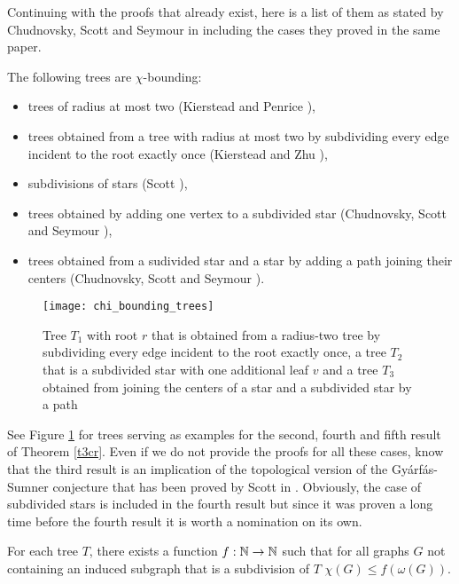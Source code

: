 Continuing with the proofs that already exist, here is a list of them as stated by Chudnovsky, Scott and Seymour in \cite{CSS17} including the cases they proved in the same paper.

\begin{thm}\label{t3cr}
The following trees are $\chi$-bounding:
\begin{itemize}
\item trees of radius at most two (Kierstead and Penrice \cite{Ki94}),
\item trees obtained from a tree with radius at most two by subdividing every edge incident to the root exactly once (Kierstead and Zhu \cite{Ki04}),
\item subdivisions of stars (Scott \cite{Sc97}),
\item trees obtained by adding one vertex to a subdivided star (Chudnovsky, Scott and Seymour \cite{CSS17}),
\item trees obtained from a sudivided star and a star by adding a path joining their centers (Chudnovsky, Scott and Seymour \cite{CSS17}).
\end{itemize} 
\end{thm}

\begin{figure}[ht]
\begin{center}
\texttt{[image: chi\_bounding\_trees]}
\end{center}
\caption{Tree $T_1$ with root $r$ that is obtained from a radius-two tree by subdividing every edge incident to the root exactly once, a tree $T_2$ that is a subdivided star with one additional leaf $v$ and a tree $T_3$ obtained from joining the centers of a star and a subdivided star by a path}
\label{f2cr}
\end{figure}

See Figure \ref{f2cr} for trees serving as examples for the second, fourth and fifth result of Theorem \ref{t3cr}. Even if we do not provide the proofs for all these cases, know that the third result is an implication of the topological version of the Gyárfás-Sumner conjecture that has been proved by Scott in \cite{Sc97}. Obviously, the case of subdivided stars is included in the fourth result but since it was proven a long time before the fourth result it is worth a nomination on its own.

\begin{thm}
For each tree $T$, there exists a function $f:\mathbb{N}\to\mathbb{N}$ such that for all graphs $G$ not containing an induced subgraph that is a subdivision of $T$ $\chi (G)\leq f(\omega (G))$.
\end{thm}

